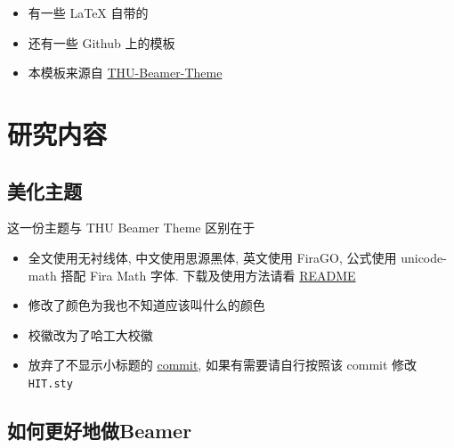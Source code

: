 \documentclass{beamer}
\begin{document}
\begin{frame}
    \begin{itemize}
        \item 有一些 \LaTeX{} 自带的
        \item 还有一些 Github 上的模板
        \item 本模板来源自 \href{https://www.latexstudio.net/archives/4051.html}{THU-Beamer-Theme}
    \end{itemize}
\end{frame}


\section{研究内容}

\subsection{美化主题}

\begin{frame}{这一份主题与 THU Beamer Theme 区别在于}
    \begin{itemize}
        \item 全文使用无衬线体, 中文使用思源黑体, 英文使用 FiraGO, 公式使用 unicode-math 搭配 Fira Math 字体. 下载及使用方法请看  \href{https://github.com/syvshc/HITBeamer\#readme}{README}
        \item 修改了颜色为我也不知道应该叫什么的颜色
        \item 校徽改为了哈工大校徽
        \item 放弃了不显示小标题的 \href{https://github.com/Trinkle23897/THU-Beamer-Theme/commit/061f088d1c7e4b2d2f1f581f3745945ecbb63f25}{commit}, 如果有需要请自行按照该 commit 修改 \texttt{HIT.sty}
    \end{itemize}
\end{frame}

\subsection{如何更好地做Beamer}
\end{document}
